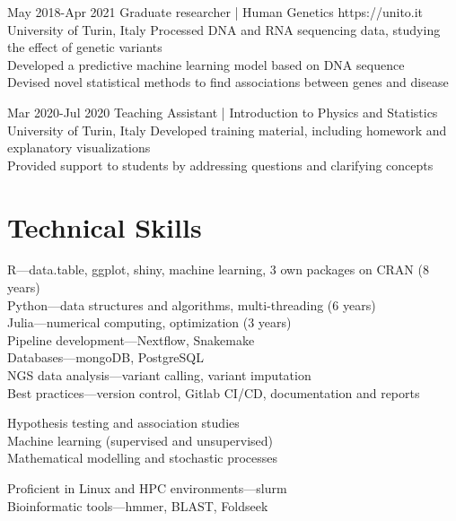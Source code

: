 \documentclass[10pt]{article} %
\begin{document}
\job
{May 2018-}{Apr 2021}
{Graduate researcher | Human Genetics}
{https://unito.it}
{University of Turin, Italy}
{
\bullet Processed DNA and RNA sequencing data, studying the effect of genetic variants \\
\bullet Developed a predictive machine learning model based on DNA sequence \\
\bullet Devised novel statistical methods to find associations between genes and disease 
}

\job
{Mar 2020-}{Jul 2020}
{Teaching Assistant | Introduction to Physics and Statistics}
{University of Turin, Italy}
{}
{
\bullet Developed training material, including homework and explanatory visualizations \\
\bullet Provided support to students by addressing questions and clarifying concepts
}


\section{Technical Skills}

{
R—data.table, ggplot, shiny, machine learning, 3 own packages on CRAN (8 years) \\
Python—data structures and algorithms, multi-threading (6 years) \\
Julia—numerical computing, optimization (3 years)\\
Pipeline development—Nextflow, Snakemake\\
Databases—mongoDB, PostgreSQL \\
NGS data analysis—variant calling, variant imputation \\
Best practices—version control, Gitlab CI/CD, documentation and reports
}

{
Hypothesis testing and association studies \\
Machine learning (supervised and unsupervised) \\
Mathematical modelling and stochastic processes
}

{
Proficient in Linux and HPC environments—slurm \\
Bioinformatic tools—hmmer, BLAST, Foldseek
}
\end{document}
